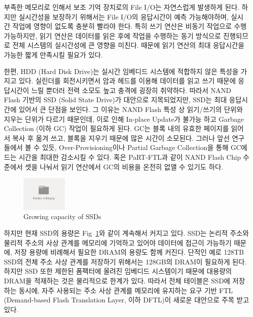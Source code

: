 \documentclass[conference]{IEEEtran}
\begin{document}
부족한 메모리로 인해서 보조 기억 장치로의 File I/O는 자연스럽게 발생하게 된다. 하지만 실시간성을 보장하기 위해서는
File I/O의 응답시간이 예측 가능해야하며, 실시간 작업에 영향이 없도록 충분히 빨라야 한다. 특히 쓰기 연산은
비동기 작업으로 수행 가능하지만, 읽기 연산은 데이터를 읽은 후에 작업을 수행하는 동기 방식으로 진행되므로
전체 시스템의 실시간성에 큰 영향을 미친다. 때문에 읽기 연산의 최대 응답시간을 가능한 짧게 만족시킬 필요가 있다. \par

한편, HDD (Hard Disk Drive)는 실시간 임베디드 시스템에 적합하지 않은 특성을 가지고 있다. 실린더를 회전시키면서
암과 헤드를 이용해 데이터를 읽고 쓰기 때문에 응답시간이 느릴 뿐더러 전력 소모도 높고 충격에 굉장히 취약하다.
따라서 NAND Flash 기반의 SSD (Solid State Drive)가 대안으로 지목되었지만, SSD는 최대 응답시간에 있어서
큰 단점을 보인다. 그 이유는 NAND Flash 특성 상 읽기/쓰기의 단위와 지우는 단위가 다르기 때문인데,
이로 인해 In-place Update가 불가능 하고 Garbage Collection (이하 GC) 작업이 필요하게 된다.
GC는 블록 내의 유효한 페이지를 읽어서 복사 후 옮겨 쓰고, 블록을 지우기 때문에 많은 시간이 소모된다.
그러나 앞선 연구들에서 볼 수 있듯, Over-Provisioning이나 Partial Garbage Collection을 통해 
GC에 드는 시간을 최대한 감소시킬 수 있다. 혹은 PaRT-FTL과 같이 NAND Flash Chip 수준에서 셋을 나눠서
읽기 연산에서 GC의 비용을 온전히 없앨 수 있기도 하다. \par

\begin{figure}[h]
	\centering
	\includegraphics[width=0.2\textwidth]{image/bg.png}
	\caption{Growing capacity of SSDs}
	\label{fig:SSD_size}
\end{figure}

하지만 현재 SSD의 용량은 Fig~\ref{fig:SSD_size}와 같이 계속해서 커지고 있다. SSD는 논리적 주소와 물리적 주소의
사상 관계를 메모리에 기억하고 있어야 데이터에 접근이 가능하기 때문에, 저장 용량에 비례해서 필요한 DRAM의 용량도
함께 커진다. 단적인 예로 128TB SSD의 전체 주소 사상 관계를 저장하기 위해서는 128GB의 DRAM이 필요하게 된다.
하지만 SSD 또한 제한된 폼팩터에 올려진 임베디드 시스템이기 때문에 대용량의 DRAM을 적재하는 것은 물리적으로 한계가 있다.
따라서 전체 테이블은 SSD에 저장하는 동시에, 자주 사용되는 주소 사상 관계를 메모리에 유지하는 요구 기반 FTL
(Demand-based Flash Translation Layer, 이하 DFTL)이 새로운 대안으로 주목 받고 있다. \par
\end{document}
